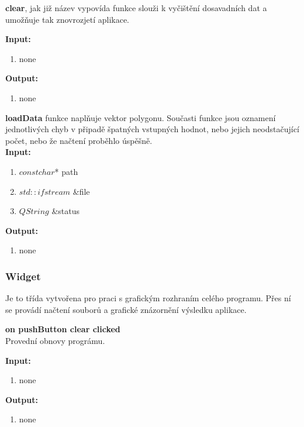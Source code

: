 \documentclass{article}
\begin{document}
\textbf{clear}, jak již název vypovída funkce slouži k vyčištění dosavadních dat a umožňuje tak znovrozjetí aplikace. 

\bigskip 
 \textbf{Input:}
\begin{enumerate} 
\item none
\end{enumerate}
\bigskip 
 \textbf{Output:}
\begin{enumerate} 
\item none
\end{enumerate}

\bigskip 

\textbf{loadData} funkce naplňuje vektor polygonu. Současti funkce jsou oznamení jednotlivých chyb v připadě špatných vstupných hodnot, nebo jejich neodstačující počet, nebo že načtení proběhlo úspěšně. \\ 


\bigskip 
 \textbf{Input:}
\begin{enumerate} 
\item $const char$* path
\item $std::ifstream$ \&file
\item $QString$ \&status
\end{enumerate}
\bigskip
 
 \textbf{Output:}
\begin{enumerate} 
\item none
\end{enumerate}

\bigskip 

\bigskip 


\subsubsection{Widget} 

\bigskip 

Je to třída vytvořena pro praci s grafickým rozhraním celého programu. Přes ní se provádí načtení souborů a grafické znázornění výsledku aplikace. \\ 

\bigskip 

\textbf{on pushButton clear clicked} 
\\
Provední obnovy prográmu. 

\bigskip 
 \textbf{Input:}
\begin{enumerate} 
\item none
\end{enumerate}
\bigskip
 \textbf{Output:}
\begin{enumerate} 
\item none
\end{enumerate}
\end{document}
